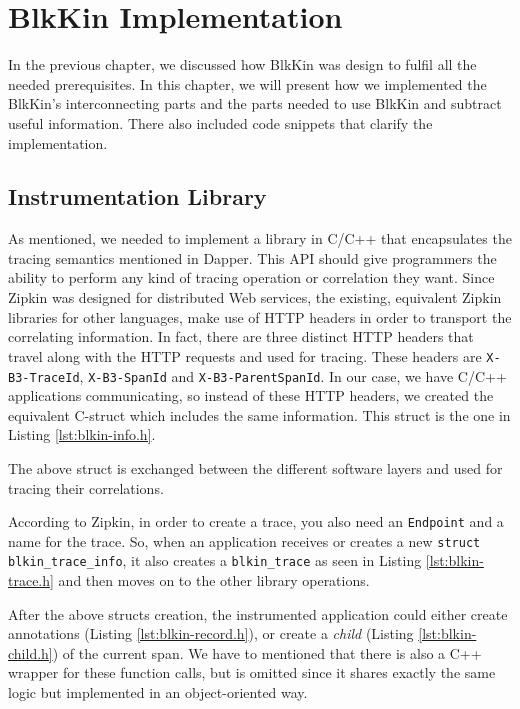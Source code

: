 \chapter{BlkKin Implementation}\label{ch:implementation}

In the previous chapter, we discussed how BlkKin was design to fulfil all the
needed prerequisites. In this chapter, we will present how we implemented the
BlkKin's interconnecting parts and the parts needed to use BlkKin and subtract
useful information. There also included code snippets that clarify the
implementation.

\section{Instrumentation Library}\label{sec:library}
As mentioned, we needed to implement a library in C/C++ that encapsulates the
tracing semantics mentioned in Dapper. This API should give programmers the
ability to perform any kind of tracing operation or correlation they want. Since
Zipkin was designed for distributed Web services, the existing, equivalent
Zipkin libraries for other languages, make use of HTTP headers in order to
transport the correlating information. In fact, there are three distinct HTTP
headers that travel along with the HTTP requests and used for tracing. These
headers are \texttt{X-B3-TraceId}, \texttt{X-B3-SpanId} and
\texttt{X-B3-ParentSpanId}. In our case, we have C/C++ applications
communicating, so instead of these HTTP headers, we created the equivalent
C-struct which includes the same information. This struct is the one in
Listing \ref{lst:blkin-info.h}.


The above struct is exchanged between the different software layers and used for
tracing their correlations.

According to Zipkin, in order to create a trace, you also need an
\texttt{Endpoint} and a name for the trace. So, when an application receives or
creates a new \texttt{struct blkin\_trace\_info}, it also creates a
\texttt{blkin\_trace} as seen in Listing \ref{lst:blkin-trace.h} and then moves
on to the other library operations. 

After the above structs creation, the instrumented application could either
create annotations (Listing \ref{lst:blkin-record.h}), or create a
\textit{child} (Listing \ref{lst:blkin-child.h}) of the current span. We have to
mentioned that there is also a C++ wrapper for these function calls, but is
omitted since it shares exactly the same logic but implemented in an
object-oriented way.

